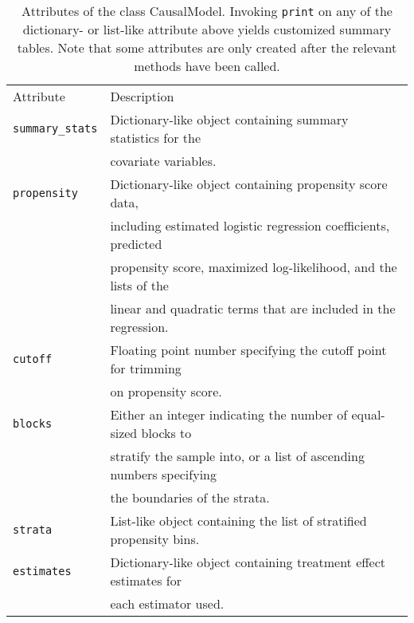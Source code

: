 \documentclass[12pt]{article}
\theoremstyle{definition}
\theoremstyle{definition}
\theoremstyle{definition}
\theoremstyle{remark}
\begin{document}
\begin{table}[h]
\begin{center}\begin{tabular}{ll}
Attribute & Description \\
\texttt{summary\_stats} & Dictionary-like object containing summary statistics for the \\
& covariate variables. \\
\texttt{propensity} & Dictionary-like object containing propensity score data, \\
& including estimated logistic regression coefficients, predicted \\
& propensity score, maximized log-likelihood, and the lists of the \\
& linear and quadratic terms that are included in the regression. \\
\texttt{cutoff} & Floating point number specifying the cutoff point for trimming \\
& on propensity score.\\
\texttt{blocks} & Either an integer indicating the number of equal-sized blocks to \\
& stratify the sample into, or a list of ascending numbers specifying \\
& the boundaries of the strata. \\
\texttt{strata} & List-like object containing the list of stratified propensity bins. \\
\texttt{estimates} & Dictionary-like object containing treatment effect estimates for \\
& each estimator used.
\end{tabular}\end{center}
\caption{Attributes of the class CausalModel. Invoking \texttt{print} on any of the dictionary- or list-like attribute above yields customized summary tables. Note that some attributes are only created after the relevant methods have been called.}  \label{tab.a}
\end{table}
\end{document}
